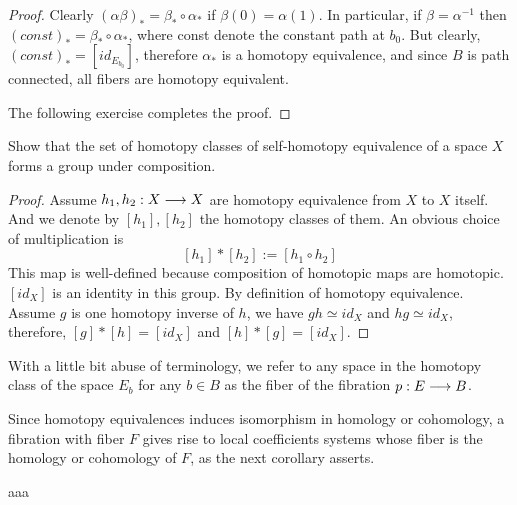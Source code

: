 \documentclass[11pt]{book} %
\begin{document}
\begin{proof}
Clearly $(\alpha\beta)_*=\beta_*\circ \alpha_*$ if $\beta(0)=\alpha(1)$. In particular, if $\beta=\alpha^{-1}$ then $(const)_*=\beta_*\circ \alpha_*$, where const denote the constant path at $b_0$. But clearly, $(const)_*=[id_{E_{b_0}}]$, therefore $\alpha_*$ is a homotopy equivalence, and since $B$ is path connected, all fibers are homotopy equivalent.

The following exercise completes the proof.
\end{proof}
\begin{exr}
Show that the set of homotopy classes of self-homotopy equivalence of a space $X$ forms a group under composition.
\end{exr}
\begin{proof}
Assume $h_1,h_2: X\longrightarrow X$ are homotopy equivalence from $X$ to $X$ itself. And we denote by $[h_1],[h_2]$ the homotopy classes of them. An obvious choice of multiplication is
$$
[h_1]*[h_2]:=[h_1\circ h_2]
$$
This map is well-defined because composition of homotopic maps are homotopic.
$[id_X]$ is an identity in this group. By definition of homotopy equivalence. Assume $g$ is one homotopy inverse of $h$, we have $gh\simeq id_X$ and $hg\simeq id_X$, therefore, $[g]*[h]=[id_X]$ and $[h]*[g]=[id_X]$.
\end{proof}
\begin{definition}
With a little bit abuse of terminology, we refer to any space in the homotopy class of the space $E_b$ for any $b\in B$ as the fiber of the fibration $p: E\longrightarrow B$.
\end{definition}

Since homotopy equivalences induces isomorphism in homology or cohomology, a fibration with fiber $F$ gives rise to local coefficients systems whose fiber is the homology or cohomology of $F$, as the next corollary asserts.

\begin{corollary}
aaa
\end{corollary}
\end{document}
